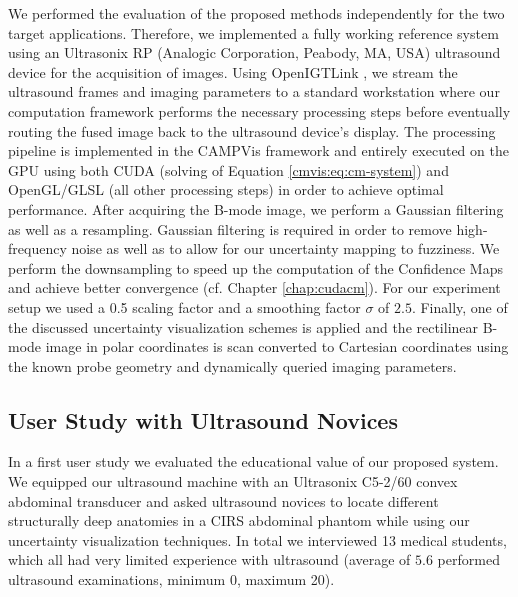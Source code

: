 We performed the evaluation of the proposed methods independently for the two target applications.
Therefore, we implemented a fully working reference system using an Ultrasonix RP (Analogic Corporation, Peabody, MA, USA) ultrasound device for the acquisition of images.
Using OpenIGTLink \cite{Tokuda:2009:Openigtlink}, we stream the ultrasound frames and imaging parameters to a standard workstation where our computation framework performs the necessary processing steps before eventually routing the fused image back to the ultrasound device's display.
The processing pipeline is implemented in the CAMPVis framework \cite{SchulteZuBerge:2014:CAMPVis} and entirely executed on the GPU using both CUDA (solving of Equation \ref{cmvis:eq:cm-system}) and OpenGL/GLSL (all other processing steps) in order to achieve optimal performance.
After acquiring the B-mode image, we perform a Gaussian filtering as well as a resampling. 
Gaussian filtering is required in order to remove high-frequency noise as well as to allow for our uncertainty mapping to fuzziness.
We perform the downsampling to speed up the computation of the Confidence Maps and achieve better convergence (cf. Chapter \ref{chap:cudacm}). 
For our experiment setup we used a 0.5 scaling factor and a smoothing factor $\sigma$ of $2.5$.
Finally, one of the discussed uncertainty visualization schemes is applied and the rectilinear B-mode image in polar coordinates is scan converted to Cartesian coordinates using the known probe geometry and dynamically queried imaging parameters.

\subsection{User Study with Ultrasound Novices}

In a first user study we evaluated the educational value of our proposed system.
We equipped our ultrasound machine with an Ultrasonix C5-2/60 convex abdominal transducer and asked ultrasound novices to locate different structurally deep anatomies in a CIRS abdominal phantom while using our uncertainty visualization techniques.
In total we interviewed 13 medical students, which all had very limited experience with ultrasound (average of $5.6$ performed ultrasound examinations, minimum 0, maximum 20).


